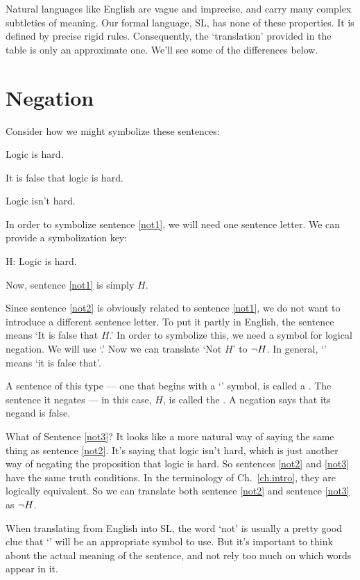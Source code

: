 Natural languages like English are vague and imprecise, and carry many complex subtleties of meaning. Our formal language, SL, has none of these properties. It is defined by precise rigid rules. Consequently, the `translation' provided in the table is only an approximate one. We'll see some of the differences below.

\section{Negation}
Consider how we might symbolize these sentences:
\begin{earg}
\item[\ex{not1}] Logic is hard.
\item[\ex{not2}] It is false that logic is hard.
\item[\ex{not3}] Logic isn't hard.
\end{earg}

In order to symbolize sentence \ref{not1}, we will need one sentence letter. We can provide a symbolization key:

\begin{ekey}
\item[H:]Logic is hard.
\end{ekey}

Now, sentence \ref{not1} is simply $H$. 

Since sentence \ref{not2} is obviously related to sentence \ref{not1}, we do not want to introduce a different sentence letter. To put it partly in English, the sentence means `It is false that $H$.' In order to symbolize this, we need a symbol for logical negation. We will use `\enot.' Now we can translate `Not $H$' to $\neg H$. In general, `\enot' means `it is false that'.

A sentence of this type --- one that begins with a `\enot' symbol, is called a . The sentence it negates --- in this case, $H$, is called the . A negation says that its negand is false.

What of Sentence \ref{not3}? It looks like a more natural  way of saying the same thing as sentence \ref{not2}. It's saying that logic isn't hard, which is just another way of negating the proposition that logic is hard. So sentences \ref{not2} and \ref{not3} have the same truth conditions. In the terminology of Ch.\ \ref{ch.intro}, they are logically equivalent.
So we can translate both sentence \ref{not2} and sentence \ref{not3} as $\neg H$.

When translating from English into SL, the word `not' is usually a pretty good clue that `\enot' will be an appropriate symbol to use. But it's important to think about the actual meaning of the sentence, and not rely too much on which words appear in it.


